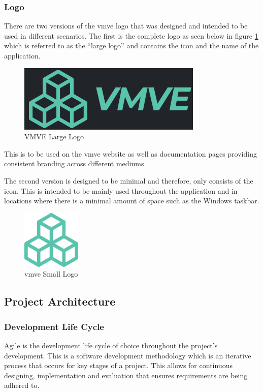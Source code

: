 \documentclass[11pt]{article}
\begin{document}
\subsubsection{Logo}
There are two versions of the \gls*{vmve} logo that was designed and intended to
be used in different scenarios. The first is the complete logo as seen below in
figure \ref{fig:project_logo_large} which is referred to as the ``large logo''
and contains the icon and the name of the application.
\begin{figure}[H]
  \centering
  \includegraphics[width=\textwidth]{images/project_logo.png}
  \caption{VMVE Large Logo}
  \label{fig:project_logo_large}
\end{figure}
This is to be used on the \gls*{vmve} website as well as documentation pages
providing consistent branding across different mediums.

The second version is designed to be minimal and therefore, only consists of the
icon. This is intended to be mainly used throughout the application and in
locations where there is a minimal amount of space such as the Windows taskbar.
\begin{figure}[H]
  \centering
  \includegraphics[width=0.25\textwidth]{images/project_icon.png}
  \caption{\gls*{vmve} Small Logo}
  \label{fig:project_logo_small}
\end{figure}


\subsection{Project Architecture}

\subsubsection{Development Life Cycle}
Agile is the development life cycle of choice throughout the project's
development. This is a software development methodology which is an iterative
process that occurs for key stages of a project. This allows for continuous
designing, implementation and evaluation that ensures requirements are being
adhered to.
\end{document}

